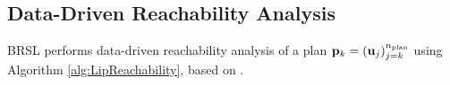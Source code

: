 




 \subsection{Data-Driven Reachability Analysis}\label{subsec:data_driven_reachability_analysis}
 
 
 
BRSL performs data-driven reachability analysis of a plan ${\mathbf{p}}_k = ({\mathbf{u}}_j)_{j=k}^{{n_{\mathrm{\textnormal{plan}}}}}$ using Algorithm \ref{alg:LipReachability}, based on \cite{alanwar2020data_conf}.

